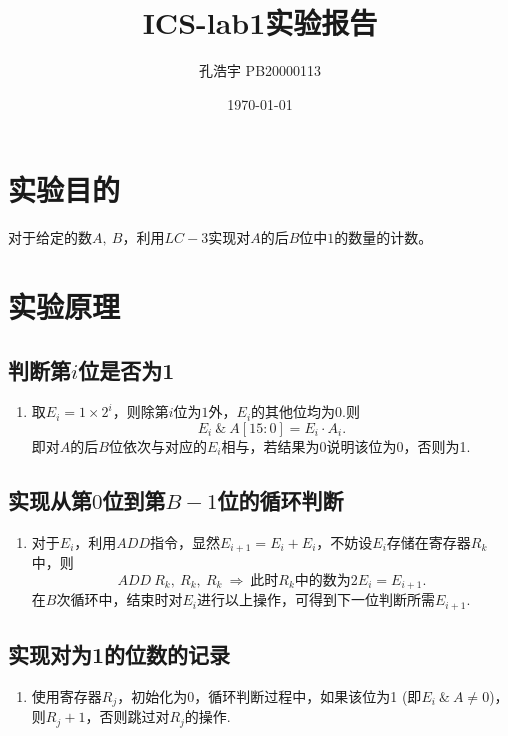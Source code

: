 \documentclass[UTF8]{ctexart}
\title{ICS-lab1实验报告}
\author{孔浩宇 PB20000113}
\date{\today}
\begin{document}
\fancyfoot[C]{\thepage}

\maketitle
\tableofcontents
\newpage

\section{实验目的}
    对于给定的数$A,\ B$，利用$LC-3$实现对$A$的后$B$位中$1$的数量的计数。

\section{实验原理}
\subsection{判断第$i$位是否为1}
    \begin{enumerate}
        \item []取$E_i = 1\times 2^{i}$，则除第$i$位为$1$外，$E_i$的其他位均为0.则
            \[
                E_i \ \& \ A[15:0] =E_i \cdot A_i .
            \]
        即对$A$的后$B$位依次与对应的$E_i$相与，若结果为0说明该位为0，否则为1.
        \end{enumerate}
\subsection{实现从第$0$位到第$B-1$位的循环判断}
    \begin{enumerate}
        \item []对于$E_i$，利用$ADD$指令，显然$E_{i+1} = E_i + E_i$，不妨设$E_i$存储在寄存器$R_k$中，则
        \[
            ADD\ R_k,\ R_k,\ R_k
            \ \Rightarrow\ 
            \mbox{此时}R_k\mbox{中的数为}2E_i=E_{i+1}.
        \]
        在$B$次循环中，结束时对$E_i$进行以上操作，可得到下一位判断所需$E_{i+1}$.
    \end{enumerate}
\subsection{实现对为1的位数的记录}
    \begin{enumerate}
        \item []使用寄存器$R_j$，初始化为0，循环判断过程中，如果该位为1 (即$E_i\ \&\ A \neq 0$)，则$R_j+1$，否则跳过对$R_j$的操作.
    \end{enumerate}
\end{document}
